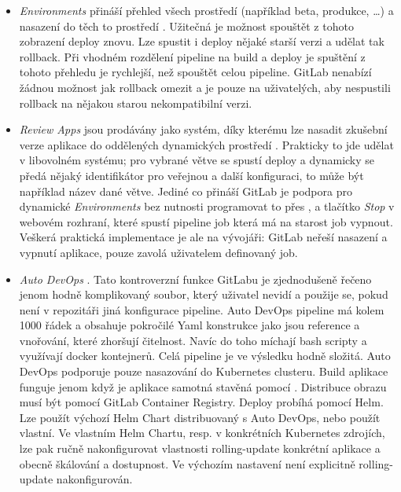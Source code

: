         \begin{itemize}
            \item \textit{Environments} přináší přehled všech prostředí (například beta, produkce, \ldots) a nasazení do těch to prostředí \cite{gitlab-environments}. Užitečná je možnost spouštět z tohoto zobrazení deploy znovu. Lze spustit i deploy nějaké starší verzi a udělat tak rollback. Při vhodném rozdělení pipeline na build a deploy je spuštění z tohoto přehledu je rychlejší, než spouštět celou pipeline. GitLab nenabízí žádnou možnost jak rollback omezit a je pouze na uživatelých, aby nespustili rollback na nějakou starou nekompatibilní verzi.
            \item \textit{Review Apps} jsou prodávány jako systém, díky kterému lze nasadit zkušební verze aplikace do oddělených dynamických prostředí \cite{gitlab-review-apps}. Prakticky to jde udělat v libovolném \CI systému; pro vybrané větve se spustí deploy a dynamicky se předá nějaký identifikátor pro veřejnou  a další konfiguraci, to může být například název dané větve. Jediné co přináší GitLab je podpora pro dynamické \textit{Environments} bez nutnosti programovat to přes , a tlačítko \textit{Stop} v webovém rozhraní, které spustí pipeline job která má na starost job vypnout. Veškerá praktická implementace je ale na vývojáři: GitLab neřeší nasazení a vypnutí aplikace, pouze zavolá uživatelem definovaný job.
            \item \textit{Auto DevOps} \cite{gitlab-auto-devops}. Tato kontroverzní \cite{gitlab-auto-devops-forum} funkce GitLabu je zjednodušeně řečeno jenom hodně komplikovaný  soubor, který uživatel nevidí a použije se, pokud není v repozitáři jiná konfigurace pipeline. Auto DevOps pipeline má kolem 1000 řádek a obsahuje pokročilé Yaml konstrukce jako jsou reference a vnořování, které zhoršují čitelnost. Navíc do toho míchají bash scripty a využívají docker kontejnerů. Celá pipeline je ve výsledku hodně složitá. Auto DevOps podporuje pouze nasazování do Kubernetes clusteru. Build aplikace funguje jenom když je aplikace samotná stavěná pomocí . Distribuce obrazu musí být pomocí GitLab Container Registry. Deploy probíhá pomocí Helm. Lze použít výchozí Helm Chart distribuovaný s Auto DevOps, nebo použít vlastní. Ve vlastním Helm Chartu, resp. v konkrétních Kubernetes zdrojích, lze pak ručně nakonfigurovat vlastnosti rolling-update konkrétní aplikace a obecně škálování a dostupnost. Ve výchozím nastavení není explicitně rolling-update nakonfigurován.
        \end{itemize}

